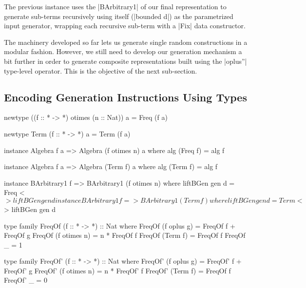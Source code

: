 The previous instance uses the |BArbitrary1| of our final representation to
generate sub-terms recursively using itself (|bounded d|) as the parametrized
input generator, wrapping each recursive sub-term with a |Fix| data constructor.

The machinery developed so far lets us generate single random constructions in a
modular fashion.
%
However, we still need to develop our generation mechanism a bit further in
order to generate composite representations built using the |oplus''| type-level
operator.
%
This is the objective of the next sub-section.

%
\subsection{Encoding Generation Instructions Using Types}

\begin{code}
newtype ((f :: * -> *) otimes (n :: Nat)) a = Freq (f a)
\end{code}

\begin{code}
newtype Term (f :: * -> *) a = Term (f a)
\end{code}

\begin{code}
instance Algebra f a => Algebra (f otimes n) a where
  alg (Freq f) = alg f
\end{code}

\begin{code}
instance Algebra f a => Algebra (Term f) a where
  alg (Term f) = alg f
\end{code}


\begin{code}
instance BArbitrary1 f => BArbitrary1 (f otimes n) where
  liftBGen gen d = Freq <$> liftBGen gen d

instance BArbitrary1 f => BArbitrary1 (Term f) where
  liftBGen gen d = Term <$> liftBGen gen d
\end{code}


\begin{code}
type family FreqOf (f :: * -> *) :: Nat where
  FreqOf (f oplus g)   = FreqOf f + FreqOf g
  FreqOf (f otimes n)  = n * FreqOf f
  FreqOf (Term f)      = FreqOf f
  FreqOf _             = 1
\end{code}

\begin{code}
type family FreqOf' (f :: * -> *) :: Nat where
  FreqOf' (f oplus g)   = FreqOf' f  +  FreqOf' g
  FreqOf' (f otimes n)  = n  *  FreqOf' f
  FreqOf' (Term f)      = FreqOf f
  FreqOf' _             = 0
\end{code}


